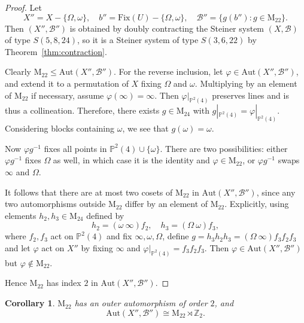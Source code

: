 \documentclass[12pt,a4paper,openany]{book}
\newtheorem{corollary}{Corollary}[section]
\newcommand{\Aut}{\mathrm{Aut}}
\newcommand{\Fix}{\mathrm{Fix}}
\newcommand{\PP}{\mathbb{P}}
\begin{document}
\begin{proof}
Let 
\[
X'' = X - \{\Omega, \omega\}, \quad
b'' = \Fix(U) - \{\Omega, \omega\}, \quad
\mathscr{B}'' = \{ g(b'') : g \in \mathrm{M}_{22} \}.
\]
Then $(X'', \mathscr{B}'')$ is obtained by doubly contracting the Steiner system $(X, \mathscr{B})$ of type $S(5, 8, 24)$, so it is a Steiner system of type $S(3, 6, 22)$ by Theorem~\ref{thm:contraction}.

Clearly $\mathrm{M}_{22} \le \Aut(X'', \mathscr{B}'')$. For the reverse inclusion, let $\varphi \in \Aut(X'', \mathscr{B}'')$, and extend it to a permutation of $X$ fixing $\Omega$ and $\omega$. Multiplying by an element of $\mathrm{M}_{22}$ if necessary, assume $\varphi(\infty) = \infty$. Then $\varphi|_{\PP^2(4)}$ preserves lines and is thus a collineation. Therefore, there exists $g \in \mathrm{M}_{24}$ with $g|_{\PP^2(4)} = \varphi|_{\PP^2(4)}$. Considering blocks containing $\omega$, we see that $g(\omega) = \omega$.

Now $\varphi g^{-1}$ fixes all points in $\PP^2(4) \cup \{\omega\}$. There are two possibilities: either $\varphi g^{-1}$ fixes $\Omega$ as well, in which case it is the identity and $\varphi \in \mathrm{M}_{22}$, or $\varphi g^{-1}$ swaps $\infty$ and $\Omega$.

It follows that there are at most two cosets of $\mathrm{M}_{22}$ in $\Aut(X'', \mathscr{B}'')$, since any two automorphisms outside $\mathrm{M}_{22}$ differ by an element of $\mathrm{M}_{22}$. Explicitly, using elements $h_2, h_3 \in \mathrm{M}_{24}$ defined by 
\[
h_2 = (\omega\ \infty) f_2, \quad h_3 = (\Omega\ \omega) f_3,
\] 
where $f_2, f_3$ act on $\PP^2(4)$ and fix $\infty, \omega, \Omega$, define $g = h_3 h_2 h_3 = (\Omega\ \infty) f_3 f_2 f_3$ and let $\varphi$ act on $X''$ by fixing $\infty$ and $\varphi|_{\PP^2(4)} = f_3 f_2 f_3$. Then $\varphi \in \Aut(X'', \mathscr{B}'')$ but $\varphi \notin \mathrm{M}_{22}$. 

Hence $\mathrm{M}_{22}$ has index $2$ in $\Aut(X'', \mathscr{B}'')$.
\end{proof}

\begin{corollary}\label{cor:M22-outer}
$\mathrm{M}_{22}$ has an outer automorphism of order $2$, and
\[
\Aut(X'', \mathscr{B}'') \cong \mathrm{M}_{22} \rtimes \mathbb{Z}_2.
\]
\end{corollary}
\end{document}
